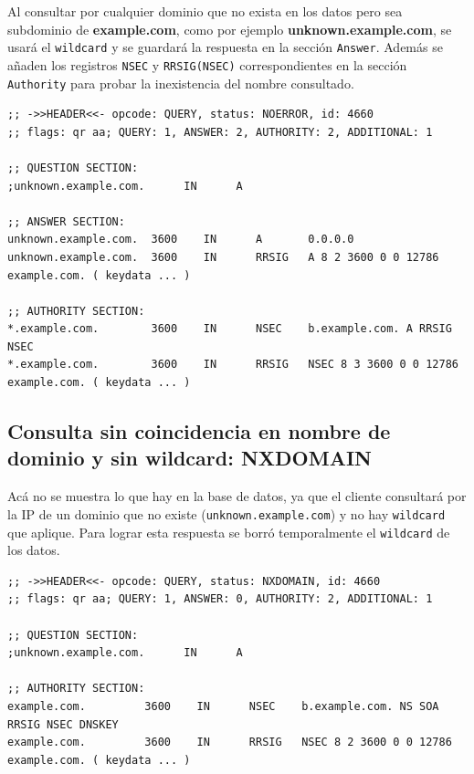 Al consultar por cualquier dominio que no exista en los datos pero sea subdominio de \textbf{example.com}, como por ejemplo \textbf{unknown.example.com}, se 
usará el \texttt{wildcard} y se guardará la respuesta en la sección \texttt{Answer}. Además se añaden los registros \texttt{NSEC} y \texttt{RRSIG(NSEC)} correspondientes en la sección 
\texttt{Authority} para probar la inexistencia del nombre consultado.\\

\newpage

\begin{lstlisting}
;; ->>HEADER<<- opcode: QUERY, status: NOERROR, id: 4660
;; flags: qr aa; QUERY: 1, ANSWER: 2, AUTHORITY: 2, ADDITIONAL: 1

;; QUESTION SECTION:
;unknown.example.com.      IN      A

;; ANSWER SECTION:
unknown.example.com.  3600    IN      A       0.0.0.0
unknown.example.com.  3600    IN      RRSIG   A 8 2 3600 0 0 12786 example.com. ( keydata ... )

;; AUTHORITY SECTION:
*.example.com.        3600    IN      NSEC    b.example.com. A RRSIG NSEC
*.example.com.        3600    IN      RRSIG   NSEC 8 3 3600 0 0 12786 example.com. ( keydata ... )
\end{lstlisting}

\subsection{Consulta sin coincidencia en nombre de dominio y sin wildcard: NXDOMAIN}

Acá no se muestra lo que hay en la base de datos, ya que el cliente consultará por la IP de un dominio que no existe (\texttt{unknown.example.com}) y no hay \texttt{wildcard} que aplique. 
Para lograr esta respuesta se borró temporalmente el \texttt{wildcard} de los datos.\\

\begin{lstlisting}
;; ->>HEADER<<- opcode: QUERY, status: NXDOMAIN, id: 4660
;; flags: qr aa; QUERY: 1, ANSWER: 0, AUTHORITY: 2, ADDITIONAL: 1

;; QUESTION SECTION:
;unknown.example.com.      IN      A

;; AUTHORITY SECTION:
example.com.         3600    IN      NSEC    b.example.com. NS SOA RRSIG NSEC DNSKEY
example.com.         3600    IN      RRSIG   NSEC 8 2 3600 0 0 12786 example.com. ( keydata ... )
\end{lstlisting}

